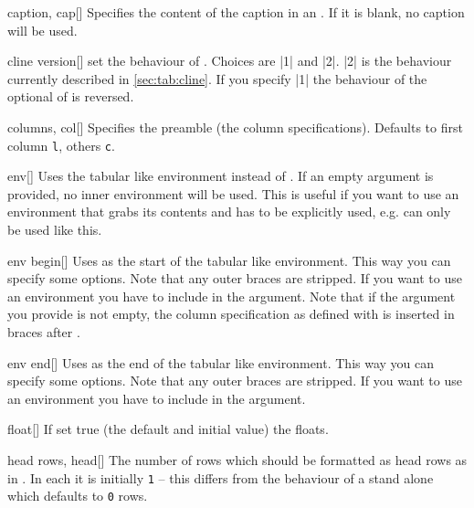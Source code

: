 \begin{describeopt}{caption, cap}[]%
  Specifies the content of the caption in an . If it is blank, no
  caption will be used.
\end{describeopt}%
\begin{describeopt}{cline version}[]%
  set the behaviour of . Choices are |1| and |2|. |2| is the
  behaviour currently described in \autoref{sec:tab:cline}. If you specify |1|
  the behaviour of the optional \meta{!} of  is reversed.
\end{describeopt}%
\begin{describeopt}{columns, col}[]%
  Specifies the  preamble (the column specifications). Defaults
  to first column \texttt{l}, others \texttt{c}.
\end{describeopt}%
\begin{describeopt}{env}[]%
  Uses the tabular like environment  instead of . If
  an empty argument is provided, no inner environment will be used. This is
  useful if you want to use an environment that grabs its contents and has to be
  explicitly used, e.g.  can only be used like this.
\end{describeopt}%
\begin{describeopt}{env begin}[]%
  Uses  as the start of the tabular like environment. This way you
  can specify some options. Note that any outer braces are stripped. If you want
  to use an environment you have to include  in the argument. Note
  that if the argument you provide is not empty, the column specification as
  defined with  is inserted in braces after .
\end{describeopt}%
\begin{describeopt}{env end}[]%
  Uses  as the end of the tabular like environment. This way you can
  specify some options. Note that any outer braces are stripped. If you want to
  use an environment you have to include  in the argument.
\end{describeopt}%
\begin{describeopt}{float}[]%
  If set true (the default and initial value) the  floats.
\end{describeopt}%
\begin{describeopt}{head rows, head}[]%
  The number of rows which should be formatted as head rows as in
  . In each  it is initially \texttt{1} -- this
  differs from the behaviour of a stand alone  which defaults to
  \texttt{0} rows.
\end{describeopt}%
